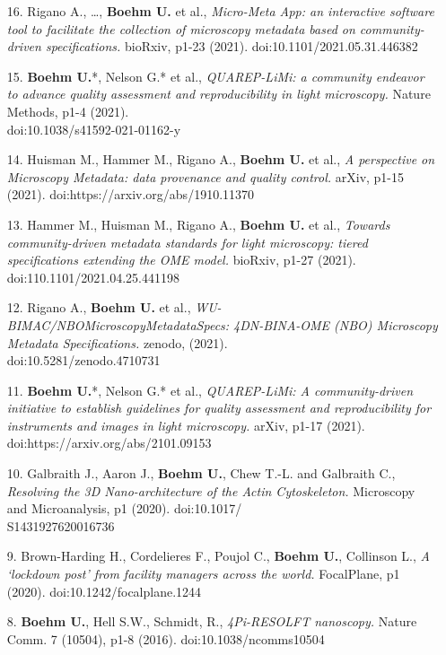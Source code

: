\documentclass[margin,line]{res}
\begin{document}
\begin{resume}
\begin{enumerate}[leftmargin=*]
\item[16.] Rigano A., \dots, {\bf Boehm U.} et al., {\it Micro-Meta App: an interactive software tool to facilitate the collection of microscopy metadata based on community-driven specifications.} bioRxiv, p1-23 (2021). doi:10.1101/2021.05.31.446382

\item[15.] {\bf Boehm U.}*, Nelson G.* et al., {\it QUAREP-LiMi: a community endeavor to advance quality assessment and reproducibility in light microscopy.} Nature Methods, p1-4 (2021). \\doi:10.1038/s41592-021-01162-y

\item[14.] Huisman M., Hammer M., Rigano A., {\bf Boehm U.} et al., {\it A perspective on Microscopy Metadata: data provenance and quality control.} arXiv, p1-15 (2021). doi:https://arxiv.org/abs/1910.11370

\item[13.] Hammer M., Huisman M., Rigano A., {\bf Boehm U.} et al., {\it Towards community-driven metadata standards for light microscopy: tiered specifications extending the OME model.} bioRxiv, p1-27 (2021). doi:110.1101/2021.04.25.441198

\item[12.] Rigano A., {\bf Boehm U.} et al., {\it WU-BIMAC/NBOMicroscopyMetadataSpecs: 4DN-BINA-OME (NBO) Microscopy Metadata Specifications.} zenodo, (2021). \\doi:10.5281/zenodo.4710731

\item[11.] {\bf Boehm U.}*, Nelson G.* et al., {\it QUAREP-LiMi: A community-driven initiative to establish guidelines for quality assessment and reproducibility for instruments and images in light microscopy.} arXiv, p1-17 (2021). doi:https://arxiv.org/abs/2101.09153

\item[10.] Galbraith J., Aaron J., {\bf Boehm U.}, Chew T.-L. and Galbraith C., {\it Resolving the 3D Nano-architecture of the Actin Cytoskeleton.} Microscopy and Microanalysis, p1 (2020). doi:10.1017/\\S1431927620016736

\item[9.] Brown-Harding H., Cordelieres F., Poujol C., {\bf Boehm U.}, Collinson L., {\it A ‘lockdown post’ from facility managers across the world.} FocalPlane, p1 (2020). doi:10.1242/focalplane.1244

\item[8.]  {\bf Boehm U.}, Hell S.W., Schmidt, R., {\it 4Pi-RESOLFT nanoscopy.} Nature Comm. 7 (10504), p1-8 (2016). doi:10.1038/ncomms10504


\end{enumerate}
\end{resume}
\end{document}
